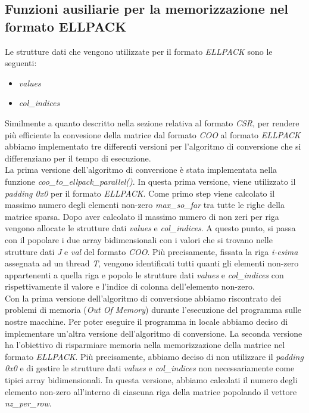 \documentclass{article}
\begin{document}
\subsection{Funzioni ausiliarie per la memorizzazione nel formato ELLPACK}
Le strutture dati che vengono utilizzate per il formato \textit{ELLPACK} sono le seguenti:

\begin{itemize}
\item \textit{values}
\item \textit{col\_indices}
\end{itemize}

Similmente a quanto descritto nella sezione relativa al formato \textit{CSR}, per rendere più efficiente la convesione della matrice dal formato \textit{COO} al formato \textit{ELLPACK} abbiamo implementato tre differenti versioni per l'algoritmo di conversione che si differenziano per il tempo di esecuzione.\\

La prima versione dell'algoritmo di conversione è stata implementata nella funzione \textit{coo\_to\_ellpack\_parallel()}. In questa prima versione, viene utilizzato il \textit{padding 0x0} per il formato \textit{ELLPACK}. Come primo step viene calcolato il massimo numero degli elementi non-zero \textit{max\_so\_far} tra tutte le righe della matrice sparsa. Dopo aver calcolato il massimo numero di non zeri per riga vengono allocate le strutture dati \textit{values} e \textit{col\_indices}. A questo punto, si passa con il popolare i due array bidimensionali con i valori che si trovano nelle strutture dati \textit{J} e \textit{val} del formato \textit{COO}. Più precisamente, fissata la riga \textit{i-esima} assegnata ad un thread \textit{T}, vengono identificati tutti quanti gli elementi non-zero appartenenti a quella riga e popolo le strutture dati \textit{values} e \textit{col\_indices} con rispettivamente il valore e l'indice di colonna dell'elemento non-zero.\\

Con la prima versione dell'algoritmo di conversione abbiamo riscontrato dei problemi di memoria (\textit{Out Of Memory}) durante l'esecuzione del programma sulle nostre macchine. Per poter eseguire il programma in locale abbiamo deciso di implementare un'altra versione dell'algoritmo di conversione. La seconda versione ha l'obiettivo di risparmiare memoria nella memorizzazione della matrice nel formato \textit{ELLPACK}. Più precisamente, abbiamo deciso di non utilizzare il \textit{padding 0x0} e di gestire le strutture dati \textit{values} e \textit{col\_indices} non necessariamente come tipici array bidimensionali. In questa versione, abbiamo calcolati il numero degli elemento non-zero all'interno di ciascuna riga della matrice popolando il vettore \textit{nz\_per\_row}.\\
\end{document}
